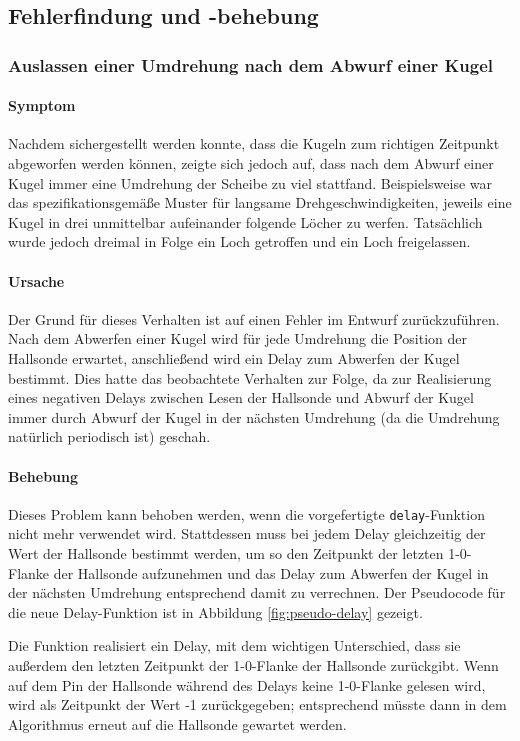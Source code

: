 \documentclass{kis}
\begin{document}
\subsection{Fehlerfindung und -behebung}

\subsubsection{Auslassen einer Umdrehung nach dem Abwurf einer Kugel}
\paragraph{Symptom}
Nachdem sichergestellt werden konnte, dass die Kugeln zum richtigen Zeitpunkt abgeworfen werden können, zeigte sich jedoch auf, dass nach dem Abwurf einer Kugel immer eine Umdrehung der Scheibe zu viel stattfand. Beispielsweise war das spezifikationsgemäße Muster für langsame Drehgeschwindigkeiten, jeweils eine Kugel in drei unmittelbar aufeinander folgende Löcher zu werfen. Tatsächlich wurde jedoch dreimal in Folge ein Loch getroffen und ein Loch freigelassen.

\paragraph{Ursache}
Der Grund für dieses Verhalten ist auf einen Fehler im Entwurf zurückzuführen. Nach dem Abwerfen einer Kugel wird für jede Umdrehung die Position der Hallsonde erwartet, anschließend wird ein Delay zum Abwerfen der Kugel bestimmt. Dies hatte das beobachtete Verhalten zur Folge, da zur Realisierung eines \glqq negativen Delays\grqq{} zwischen Lesen der Hallsonde und Abwurf der Kugel immer durch Abwurf der Kugel in der nächsten Umdrehung (da die Umdrehung natürlich periodisch ist) geschah. 

\paragraph{Behebung}
Dieses Problem kann behoben werden, wenn die vorgefertigte \texttt{delay}-Funktion nicht mehr verwendet wird. Stattdessen muss bei jedem Delay gleichzeitig der Wert der Hallsonde bestimmt werden, um so den Zeitpunkt der letzten 1-0-Flanke der Hallsonde aufzunehmen und das Delay zum Abwerfen der Kugel in der nächsten Umdrehung entsprechend damit zu verrechnen. Der Pseudocode für die neue Delay-Funktion ist in Abbildung \ref{fig:pseudo-delay} gezeigt.

Die Funktion realisiert ein Delay, mit dem wichtigen Unterschied, dass sie außerdem den letzten Zeitpunkt der 1-0-Flanke der Hallsonde zurückgibt. Wenn auf dem Pin der Hallsonde während des Delays keine 1-0-Flanke gelesen wird, wird als Zeitpunkt der Wert -1 zurückgegeben; entsprechend müsste dann in dem Algorithmus erneut auf die Hallsonde gewartet werden.
\end{document}
